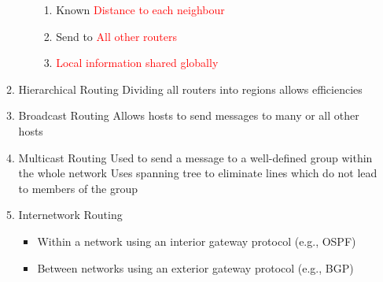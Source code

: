 \documentclass[a4paper,10pt]{article}
\newcommand{\red}[1]{\textcolor{red}{#1}}
\begin{document}
\begin{enumerate}
\begin{enumerate}
\begin{enumerate}
\begin{enumerate}
              \item Known
                \newline\red{Distance to each neighbour}
              \item Send to
                \newline\red{All other routers}
              \item \red{Local information shared globally}
            \end{enumerate}
        \end{enumerate}
      \item Hierarchical Routing
        \newline Dividing all routers into regions allows efficiencies
      \item Broadcast Routing
        \newline Allows hosts to send messages to many or all other hosts
      \item Multicast Routing
        \newline Used to send a message to a well-defined group within the whole network
        \newline Uses spanning tree to eliminate lines which do not lead to members of the group
      \item Internetwork Routing
        \begin{itemize}
          \item Within a network using an interior gateway protocol (e.g., OSPF)
          \item Between networks using an exterior gateway protocol (e.g., BGP)
        \end{itemize}
    \end{enumerate}
  

\end{enumerate}
\end{document}

